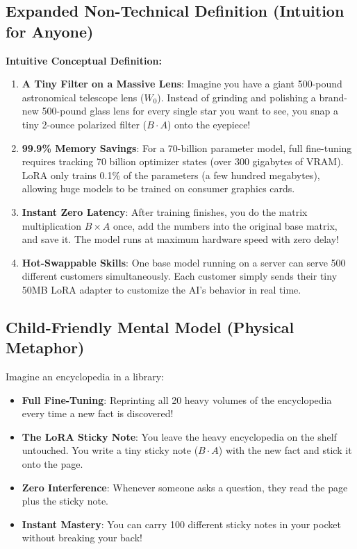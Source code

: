 \documentclass[11pt,a4paper]{article}
\theoremstyle{definition}
\begin{document}
\subsection{Expanded Non-Technical Definition (Intuition for Anyone)}
\textbf{Intuitive Conceptual Definition:}
\begin{enumerate}
    \item \textbf{A Tiny Filter on a Massive Lens}: Imagine you have a giant 500-pound astronomical telescope lens ($W_0$). Instead of grinding and polishing a brand-new 500-pound glass lens for every single star you want to see, you snap a tiny 2-ounce polarized filter ($B \cdot A$) onto the eyepiece!
    \item \textbf{99.9\% Memory Savings}: For a 70-billion parameter model, full fine-tuning requires tracking 70 billion optimizer states (over 300 gigabytes of VRAM). LoRA only trains 0.1\% of the parameters (a few hundred megabytes), allowing huge models to be trained on consumer graphics cards.
    \item \textbf{Instant Zero Latency}: After training finishes, you do the matrix multiplication $B \times A$ once, add the numbers into the original base matrix, and save it. The model runs at maximum hardware speed with zero delay!
    \item \textbf{Hot-Swappable Skills}: One base model running on a server can serve 500 different customers simultaneously. Each customer simply sends their tiny 50MB LoRA adapter to customize the AI's behavior in real time.
\end{enumerate}

\subsection{Child-Friendly Mental Model (Physical Metaphor)}
Imagine an encyclopedia in a library:
\begin{itemize}
    \item \textbf{Full Fine-Tuning}: Reprinting all 20 heavy volumes of the encyclopedia every time a new fact is discovered!
    \item \textbf{The LoRA Sticky Note}: You leave the heavy encyclopedia on the shelf untouched. You write a tiny sticky note ($B \cdot A$) with the new fact and stick it onto the page.
    \item \textbf{Zero Interference}: Whenever someone asks a question, they read the page plus the sticky note.
    \item \textbf{Instant Mastery}: You can carry 100 different sticky notes in your pocket without breaking your back!
\end{itemize}
\end{document}
